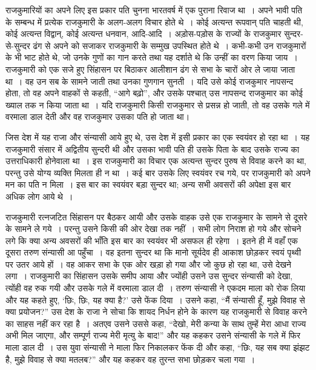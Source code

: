 राजकुमारियों का अपने लिए इस प्रकार पति चुनना भारतवर्ष में एक पुराना रिवाज था~। अपने भावी पति के सम्बन्ध में प्रत्येक राजकुमारी के अलग-अलग विचार होते थे~। कोई अत्यन्त रूपवान् पति चाहती थी, कोई अत्यन्त विद्वान्, कोई अत्यन्त धनवान, आदि-आदि~। अड़ोस-पड़ोस के राज्यों के राजकुमार सुन्दर-से-सुन्दर ढंग से अपने को सजाकर राजकुमारी के सम्मुख उपस्थित होते थे~। कभी-कभी उन राजकुमारों के भी भाट होते थे, जो उनके गुणों का गान करते तथा यह दर्शाते थे कि उन्हीं का वरण किया जाय~। राजकुमारी को एक सजे हुए सिंहासन पर बिठाकर आलीशान ढंग से सभा के चारों ओर ले जाया जाता था~। वह उन सब के सामने जाती तथा उनका गुणगान सुनती~। यदि उसे कोई राजकुमार नापसन्द होता, तो वह अपने वाहकों से कहती, “आगे बढ़ो”, और उसके पश्चात् उस नापसन्द राजकुमार का कोई ख्याल तक न किया जाता था~। यदि राजकुमारी किसी राजकुमार से प्रसन्न हो जाती, तो वह उसके गले में वरमाला डाल देती और वह राजकुमार उसका पति हो जाता था।

जिस देश में यह राजा और संन्यासी आये हुए थे, उस देश में इसी प्रकार का एक स्वयंवर हो रहा था~। यह राजकुमारी संसार में अद्वितीय सुन्दरी थी और उसका भावी पति ही उसके पिता के बाद उसके राज्य का उत्तराधिकारी होनेवाला था~। इस राजकुमारी का विचार एक अत्यन्त सुन्दर पुरुष से विवाह करने का था, परन्तु उसे योग्य व्यक्ति मिलता ही न था~। कई बार उसके लिए स्वयंवर रच गये, पर राजकुमारी को अपने मन का पति न मिला~। इस बार का स्वयंवर बड़ा सुन्दर था; अन्य सभी अवसरों की अपेक्षा इस बार अधिक लोग आये थे~।

राजकुमारी रत्नजटित सिंहासन पर बैठकर आयी और उसके वाहक उसे एक राजकुमार के सामने से दूसरे के सामने ले गये~। परन्तु उसने किसी की ओर देखा तक नहीं~। सभी लोग निराश हो गये और सोचने लगे कि क्या अन्य अवसरों की भाँति इस बार का स्वयंवर भी असफल ही रहेगा~। इतने ही में वहाँ एक दूसरा तरुण संन्यासी आ पहुँचा~। वह इतना सुन्दर था कि मानो सूर्यदेव ही आकाश छोड़कर स्वयं पृथ्वी पर उतर आये हों~। वह आकर सभा के एक ओर खड़ा हो गया और जो कुछ हो रहा था, उसे देखने लगा~। राजकुमारी का सिंहासन उसके समीप आया और ज्योंही उसने उस सुन्दर संन्यासी को देखा, त्योंही वह रुक गयी और उसके गले में वरमाला डाल दी~। तरुण संन्यासी ने एकदम माला को रोक लिया और यह कहते हुए, ‘छिः, छिः, यह क्या है?’ उसे फेंक दिया~। उसने कहा, “मैं संन्यासी हूँ, मुझे विवाह से क्या प्रयोजन?” उस देश के राजा ने सोचा कि शायद निर्धन होने के कारण यह राजकुमारी से विवाह करने का साहस नहीं कर रहा है~। अतएव उसने उससे कहा, “देखो, मेरी कन्या के साथ तुम्हें मेरा आधा राज्य अभी मिल जाएगा, और सम्पूर्ण राज्य मेरी मृत्यु के बाद!” और यह कहकर उसने संन्यासी के गले में फिर माला डाल दी~। उस युवा संन्यासी ने माला फिर निकालकर फेंक दी और कहा, “छिः, यह सब क्या झंझट है, मुझे विवाह से क्या मतलब?” और यह कहकर वह तुरन्त सभा छोड़कर चला गया~।

